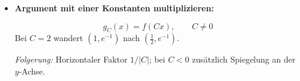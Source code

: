\begin{itemize}[leftmargin=*,itemsep=0.9\baselineskip,topsep=0.5\baselineskip]
  \item \textbf{Argument mit einer Konstanten multiplizieren:}
    \par\smallskip
    \begin{minipage}[c]{0.40\linewidth}
      \raggedright
      \[
        g_C(x)=f(Cx),\qquad C\ne0
      \]
      Bei $C=2$ wandert $(1,e^{-1})$ nach $(\tfrac12,e^{-1})$.
      \par\smallskip
      \emph{Folgerung:} Horizontaler Faktor $1/|C|$;
      bei $C<0$ zusätzlich Spiegelung an der $y$-Achse.
    \end{minipage}\hfill
    \begin{minipage}[c]{0.55\linewidth}
      \centering
    \end{minipage}
\end{itemize}

